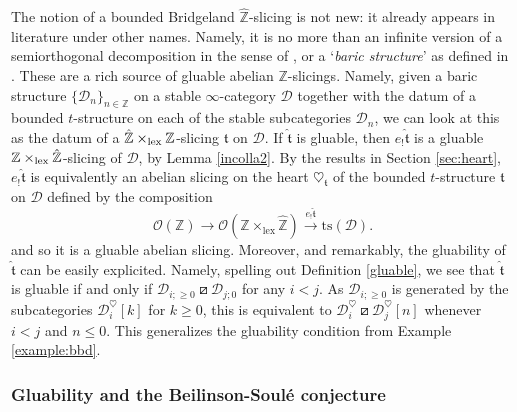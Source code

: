 \documentclass{article}
\theoremstyle{definition}
\newcommand{\Z}{\mathbb{Z}}
\newcommand{\Oo}{\mathcal{O}}
\newcommand{\ts}{\mathrm{ts}}
\newcommand{\tee}{\mathfrak{t}}
\newcommand{\orth}{\boxslash}
\newcommand{\lex}{\times_{\textnormal{lex}}}
\begin{document}
  The notion of a bounded Bridgeland $\hat{\Z}$-slicing is not new: it already appears in literature under other names. Namely, it is no more than an infinite version of a semiorthogonal decomposition in the sense of \cite{semiort}, or a `\textit{baric structure}' as defined in \cite{baric}. These are a rich source of gluable abelian $\Z$-slicings. Namely, given a baric structure $\{\mathscr{D}_{n}\}_{n\in \mathbb{Z}}$ on a stable $\infty$-category $\mathscr{D}$ together with the datum of a bounded $t$-structure on each of the stable subcategories $\mathscr{D}_{n}$, we can look at this as the datum of a $\hat{\Z} \lex \Z$-slicing $\hat{\tee}$ on $\mathscr{D}$. If $\hat{\tee}$ is gluable, then $e_!\hat{\tee}$ is a gluable ${\Z} \lex \hat{\Z}$-slicing of $\mathscr{D}$, by Lemma \ref{incolla2}. By the results in Section \ref{sec:heart}, $e_!\hat{\tee}$ is equivalently an abelian slicing on the heart $\heartsuit_{{\tee}}$ of the bounded $t$-structure ${\tee}$ on $\mathscr{D}$ defined by the composition
  \[
 \Oo(\Z)\to \Oo(\Z\times_{\mathrm{lex}}\hat{\Z})\xrightarrow{e_!\hat{\tee}} \ts(\mathscr{D}).
  \]
 and so it is a gluable abelian slicing. {\color{red}Moreover, and remarkably, the gluability of $\hat{\tee}$ can be easily explicited. Namely, spelling out Definition \ref{gluable}, we see that $\hat{\tee}$ is gluable if and only if  $\mathscr{D}_{i;\geq 0}\orth \mathscr{D}_{j;0}$ for any $i<j$. {\color{red}As  $\mathscr{D}_{i;\geq 0}$ is generated by the subcategories $\mathscr{D}_{i}^\heartsuit[k]$ for $k\geq 0$, this is equivalent to $\mathscr{D}_{i}^\heartsuit\orth\mathscr{D}_{j}^\heartsuit[n]$ whenever $i<j$ and $n\leq 0$. This generalizes the gluability condition from Example \ref{example:bbd}.} 
 }

\subsubsection{Gluability and the Beilinson-Soul\'e conjecture}\label{motives}


\end{document}
